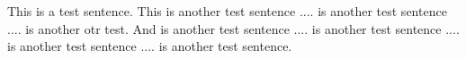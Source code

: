 \documentclass{article}
\begin{document}
\sss{}This is a test sentence.\sse{}  \sss{}This 
is another test sentence ....
is another test sentence ....
is another otr test.\sse{}  \sss{}And
is another test sentence ....
is another test sentence ....
is another test sentence ....
is another test sentence.\sse{}







\end{document}

